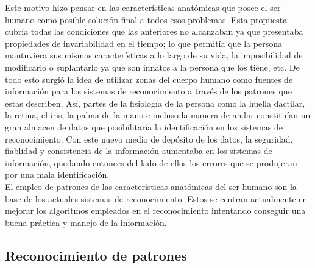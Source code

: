 Este motivo hizo pensar en las características anatómicas que posee el ser humano como posible solución final a todos esos problemas. Esta propuesta cubría todas las condiciones que las anteriores no alcanzaban ya que presentaba propiedades de invariabilidad en el tiempo; lo que permitía que la persona mantuviera sus mismas características a lo largo de su vida, la imposibilidad de modificarlo o suplantarlo ya que son innatos a la persona que los tiene, etc. De todo esto surgió la idea de utilizar zonas del cuerpo humano como fuentes de información para los sistemas de reconocimiento a través de los patrones que estas describen. Así, partes de la fisiología de la persona como la huella dactilar, la retina, el iris, la palma de la mano e incluso la manera de andar constituían un gran almacen de datos que posibilitaría la identificación en los sistemas de reconocimiento. Con este nuevo medio de depósito de los datos, la seguridad, fiablidad y consistencia de la información aumentaba en los sistemas de información, quedando entonces del lado de ellos los errores que se produjeran por una mala identificación.  \\

El empleo de patrones de las características anatómicas del ser humano son la base de los actuales sistemas de reconocimiento. Estos se centran actualmente en mejorar los algoritmos empleados en el reconocimiento intentando conseguir una buena práctica y manejo de la información.   \\


\subsection{Reconocimiento de patrones}

